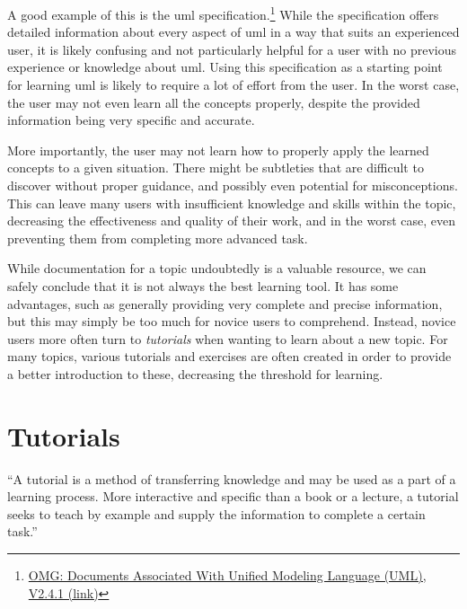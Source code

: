 \noindent
A good example of this is the \gls{uml} specification.\footnote{\href{http://www.omg.org/spec/UML/2.4.1/}{OMG: Documents Associated With Unified Modeling Language (UML), V2.4.1 (link)}} While the specification offers detailed information about every aspect of \gls{uml} in a way that suits an experienced user, it is likely confusing and not particularly helpful for a user with no previous experience or knowledge about \gls{uml}. Using this specification as a starting point for learning \gls{uml} is likely to require a lot of effort from the user. In the worst case, the user may not even learn all the concepts properly, despite the provided information being very specific and accurate.

\noindent
More importantly, the user may not learn how to properly apply the learned concepts to a given situation. There might be subtleties that are difficult to discover without proper guidance, and possibly even potential for misconceptions. This can leave many users with insufficient knowledge and skills within the topic, decreasing the effectiveness and quality of their work, and in the worst case, even preventing them from completing more advanced task.

\noindent
While documentation for a topic undoubtedly is a valuable resource, we can safely conclude that it is not always the best learning tool. It has some advantages, such as generally providing very complete and precise information, but this may simply be too much for novice users to comprehend. Instead, novice users more often turn to \emph{tutorials} when wanting to learn about a new topic. For many topics, various tutorials and exercises are often created in order to provide a better introduction to these, decreasing the threshold for learning.

\section{Tutorials}
\label{sec:tutorials}
``A tutorial is a method of transferring knowledge and may be used as a part of a learning process. More interactive and specific than a book or a lecture, a tutorial seeks to teach by example and supply the information to complete a certain task.''~\cite{wiki:tutorial}

